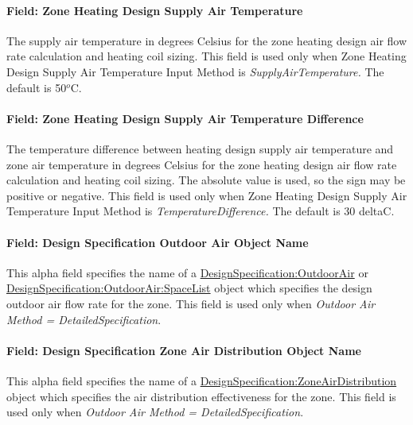 \paragraph{Field: Zone Heating Design Supply Air Temperature}\label{field-zone-heating-design-supply-air-temperature-1}

The supply air temperature in degrees Celsius for the zone heating design air flow rate calculation and heating coil sizing. This field is used only when Zone Heating Design Supply Air Temperature Input Method is \emph{SupplyAirTemperature.} The default is 50\(^{o}\)C.

\paragraph{Field: Zone Heating Design Supply Air Temperature Difference}\label{field-zone-heating-design-supply-air-temperature-difference-2}

The temperature difference between heating design supply air temperature and zone air temperature in degrees Celsius for the zone heating design air flow rate calculation and heating coil sizing. The absolute value is used, so the sign may be positive or negative. This field is used only when Zone Heating Design Supply Air Temperature Input Method is \emph{TemperatureDifference.} The default is 30 deltaC.

\paragraph{Field: Design Specification Outdoor Air Object Name}\label{field-design-specification-outdoor-air-object-name-4}

This alpha field specifies the name of a \hyperref[designspecificationoutdoorair]{DesignSpecification:OutdoorAir} or \hyperref[designspecificationoutdoorairspacelist]{DesignSpecification:OutdoorAir:SpaceList} object which specifies the design outdoor air flow rate for the zone. This field is used only when \emph{Outdoor Air Method = DetailedSpecification}.

\paragraph{Field: Design Specification Zone Air Distribution Object Name}\label{field-design-specification-zone-air-distribution-object-name-3}

This alpha field specifies the name of a \hyperref[designspecificationzoneairdistribution]{DesignSpecification:ZoneAirDistribution} object which specifies the air distribution effectiveness for the zone. This field is used only when \emph{Outdoor Air Method = DetailedSpecification}.

